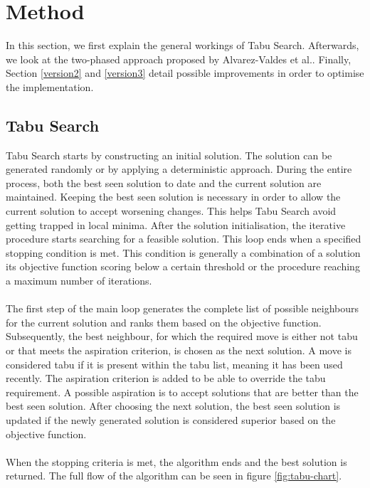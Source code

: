 
\section{Method}\label{sec:method}
In this section, we first explain the general workings of Tabu Search. Afterwards, we look at the two-phased approach proposed by Alvarez-Valdes et al.\cite{alvarez1997}. Finally, Section \ref{version2} and \ref{version3} detail possible improvements in order to optimise the implementation.

\subsection{Tabu Search}

Tabu Search\cite{glover1993} starts by constructing an initial solution. The solution can be generated randomly or by applying a deterministic approach. During the entire process, both the best seen solution to date and the current solution are maintained. Keeping the best seen solution is necessary in order to allow the current solution to accept worsening changes. This helps Tabu Search avoid getting trapped in local minima. After the solution initialisation, the iterative procedure starts searching for a feasible solution. This loop ends when a specified stopping condition is met. This condition is generally a combination of a solution its objective function scoring below a certain threshold or the procedure reaching a maximum number of iterations.
\\\\
The first step of the main loop generates the complete list of possible neighbours for the current solution and ranks them based on the objective function. Subsequently, the best neighbour, for which the required move is either not tabu or that meets the aspiration criterion, is chosen as the next solution. A move is considered tabu if it is present within the tabu list, meaning it has been used recently. The aspiration criterion is added to be able to override the tabu requirement. A possible aspiration is to accept solutions that are better than the best seen solution. After choosing the next solution, the best seen solution is updated if the newly generated solution is considered superior based on the objective function.
\\\\
When the stopping criteria is met, the algorithm ends and the best solution is returned. The full flow of the algorithm can be seen in figure \ref{fig:tabu-chart}.

